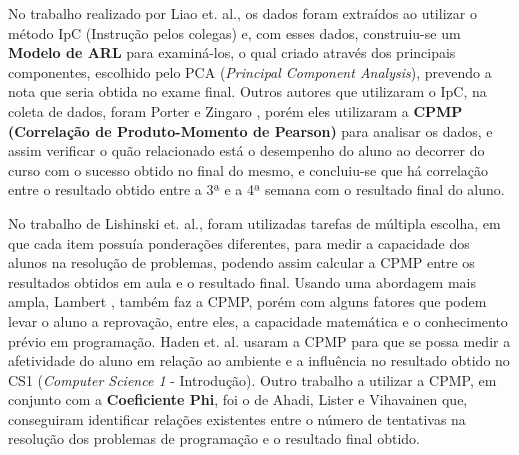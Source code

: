 \documentclass[12pt]{article}
\begin{document}

No trabalho realizado por Liao et. al.\cite{Liao2016}, os dados foram extraídos ao utilizar o método IpC (Instrução pelos colegas) e, com esses dados, construiu-se um \textbf{Modelo de ARL} para examiná-los, o qual criado através dos principais componentes, escolhido pelo PCA (\textit{Principal Component Analysis}), prevendo a nota que seria obtida no exame final. Outros autores que utilizaram o IpC, na coleta de dados, foram Porter e Zingaro \cite{Porter2014}, porém eles utilizaram a \textbf{CPMP (Correlação de Produto-Momento de Pearson)} para analisar os dados, e assim verificar o quão relacionado está o desempenho do aluno ao decorrer do curso com o sucesso obtido no final do mesmo, e concluiu-se que há correlação entre o resultado obtido entre a 3ª e a 4ª semana com o resultado final do aluno.

No trabalho de Lishinski et. al.\cite{Lishinski2016}, foram utilizadas tarefas de múltipla escolha, em que cada item possuía ponderações diferentes, para medir a capacidade dos alunos na resolução de problemas, podendo assim calcular a CPMP entre os resultados obtidos em aula e o resultado final. Usando uma abordagem mais ampla, Lambert \cite{Lambert2015}, também faz a CPMP, porém com alguns fatores que podem levar o aluno a reprovação, entre eles, a capacidade matemática e o conhecimento prévio em programação. Haden et. al. \cite{Haden2017} usaram a CPMP para que se possa medir a afetividade do aluno em relação ao ambiente e a influência no resultado obtido no CS1 (\textit{Computer Science 1} - Introdução). Outro trabalho a utilizar a CPMP, em conjunto com a \textbf{Coeficiente Phi}, foi o de Ahadi, Lister e Vihavainen \cite{Ahadi2016} que, conseguiram identificar relações existentes entre o número de tentativas na resolução dos problemas de programação e o resultado final obtido. 
\end{document}
